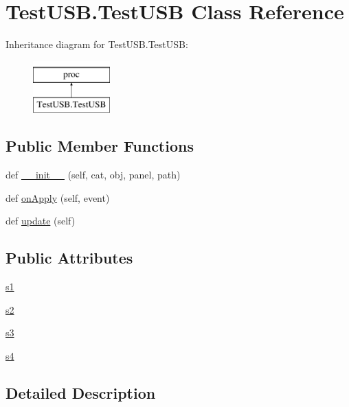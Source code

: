 \hypertarget{classTestUSB_1_1TestUSB}{}\section{Test\+U\+S\+B.\+Test\+U\+SB Class Reference}
\label{classTestUSB_1_1TestUSB}
Inheritance diagram for Test\+U\+S\+B.\+Test\+U\+SB\+:\begin{figure}[H]
\begin{center}
\leavevmode
\includegraphics[height=2.000000cm]{classTestUSB_1_1TestUSB}
\end{center}
\end{figure}
\subsection*{Public Member Functions}
\begin{DoxyCompactItemize}
\item 
def \hyperlink{classTestUSB_1_1TestUSB_a5b0c3f54b8c11fa9a0e02767bf409b6e}{\+\_\+\+\_\+init\+\_\+\+\_\+} (self, cat, obj, panel, path)
\item 
def \hyperlink{classTestUSB_1_1TestUSB_a84bfb6f16ea97644b1369e853a0da21b}{on\+Apply} (self, event)
\item 
def \hyperlink{classTestUSB_1_1TestUSB_a89c7535b44613d7a31879376527aadc7}{update} (self)
\end{DoxyCompactItemize}
\subsection*{Public Attributes}
\begin{DoxyCompactItemize}
\item 
\hyperlink{classTestUSB_1_1TestUSB_a1c2db95a9c835bae85479461f8c5d722}{s1}
\item 
\hyperlink{classTestUSB_1_1TestUSB_adc6c526d953e95dc252a9f186c8c66d7}{s2}
\item 
\hyperlink{classTestUSB_1_1TestUSB_a2983f5d10e563e44de3beac6fc9cb165}{s3}
\item 
\hyperlink{classTestUSB_1_1TestUSB_a0e240d453ee3a58d9d9438dae4aa42ba}{s4}
\end{DoxyCompactItemize}


\subsection{Detailed Description}


